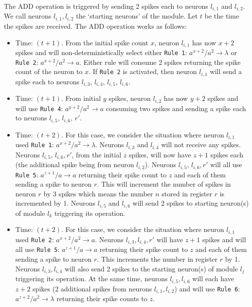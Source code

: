 \documentclass[smallextended]{svjour3}
\begin{document}
The ADD operation is triggered by sending 2 spikes each to neurons $l_{i,1}$ and ${l_{i,2}}$. We call neurons $l_{i,1}, l_{i,2}$ the `starting neurons'
of the module. Let $t$ be the time the spikes are received. The ADD operation works as follows:
\begin{itemize}
   \item Time: $(t+1)$. From the initial spike count $x$, neuron $l_{i,1}$ has now $x+2$ spikes and will non-deterministically select either 
                        \texttt{Rule 1}: $a^{x+2}/a^2 \rightarrow \lambda$ or \texttt{Rule 2}: $a^{x+2}/a^2 \rightarrow a$. Either rule will consume
                        2 spikes returning the spike count of the neuron to $x$. If \texttt{Rule 2} is activated, then neuron $l_{i,1}$ will send a 
                        spike each to neurons $l_{i,3}$, $l_{i,4}$, $l_{i,5}$, $l_{i,6}$.
   \item Time: $(t+1)$. From initial $y$ spikes, neuron $l_{i,2}$ has now $y+2$ spikes and will use \texttt{Rule 4}: $a^{y+2}/a^2 \rightarrow a$ 
                        consuming two spikes and sending a spike each to neurons $l_{i,5}$, $l_{i,6}$, $r'$.

   \item Time: $(t+2)$. For this case, we consider the situation where neuron $l_{i,1}$ used \texttt{Rule 1}: $a^{x+2}/a^2 \rightarrow \lambda$. 
                        Neurons $l_{i,3}$ and $l_{i,4}$ will not receive any spikes. Neurons $l_{i,5}$, $l_{i,6}, r'$, from the initial $z$ spikes, 
                        will now have $z+1$ spikes each (the additional spike being from neuron $l_{i,2}$). Neurons $l_{i,5}$, $l_{i,6}, r'$ will all
                        use \texttt{Rule 5}: $a^{z+1}/a \rightarrow a$ returning their spike count to $z$ and each of them sending a spike to neuron 
                        $r$. This will increment the number of spikes in neuron $r$ by 3 spikes which means the number $n$ stored in register $r$ is 
                        incremented by 1. Neurons $l_{i,5}$ and $l_{i,6}$ will send $2$ spikes to starting neuron(s) of module $l_k$ triggering its 
                        operation.
   \item Time: $(t+2)$. For this case, we consider the situation where neuron $l_{i,1}$ used \texttt{Rule 2}: $a^{x+2}/a^2 \rightarrow a $.
                        Neurons $l_{i,3}, l_{i,4}, r'$ will have $z+1$ spikes and will all use  \texttt{Rule 5}: $a^{z+1}/a \rightarrow a$ returning 
                        their spike count to $z$ and each of them sending a spike to neuron $r$. This increments the number in register $r$ by 1.
                        Neurons $l_{i,3}, l_{i,4}$ will also send 2 spikes to the starting neuron(s) of module $l_j$ triggering its operation. At the same
                        time, neurons $l_{i,5}, l_{i,6}$ will each have $z+2$ spikes (2 additional spikes from neurons $l_{i,1}, l_{i,2}$) and will 
                        use \texttt{Rule 6}: $a^{z+2}/a^2 \rightarrow \lambda$ returning their spike counts to $z$.
\end{itemize}
\end{document}
